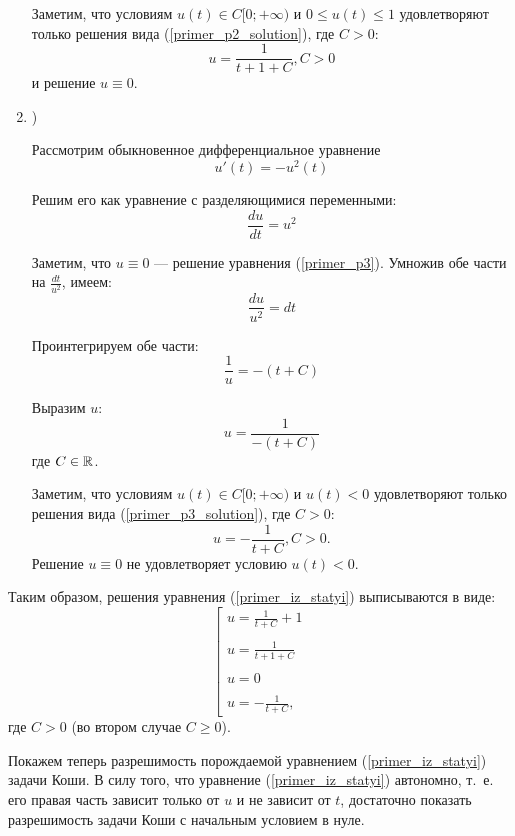 \begin{enumerate}
Заметим, что условиям $u(t) \in C[0; +\infty)$ и $0 \leq u(t) \leq 1$ удовлетворяют только решения вида (\ref{primer_p2_solution}), где $C>0$:
\begin{equation}
	u=\frac{1}{t+1+C}, C>0
\end{equation}
и решение $u \equiv 0$.




\item)

Рассмотрим обыкновенное дифференциальное уравнение
\begin{equation}\label{primer_p3}
	u'(t)=-u^2(t)
\end{equation}

Решим его как уравнение с разделяющимися переменными:
$$
	\frac{du}{dt}=u^2
$$

Заметим, что $u\equiv 0$ --- решение уравнения (\ref{primer_p3}).
Умножив обе части на $\frac{dt}{u^2}$, имеем:
$$
	\frac{du}{u^2}=dt
$$

Проинтегрируем обе части:
$$
	\frac{1}{u}=-(t+C)
$$

Выразим $u$:
\begin{equation}\label{primer_p3_solution}
	u=\frac{1}{-(t+C)}
\end{equation}
где $C\in\mathbb{R}$.

Заметим, что условиям $u(t) \in C[0; +\infty)$ и $u(t) < 0$ удовлетворяют только решения вида (\ref{primer_p3_solution}), где $C>0$:
\begin{equation}
	u=-\frac{1}{t+C}, C>0.
\end{equation}
Решение $u \equiv 0$ не удовлетворяет условию $u(t)<0$.

\end{enumerate}

Таким образом, решения уравнения (\ref{primer_iz_statyi}) выписываются в виде:
\begin{equation}\label{primer_iz_statyi_u_t}
	\left[
		\begin{array}{l}
			u=\frac{1}{t+C}+1
		\\\\
			u=\frac{1}{t+1+C}
		\\\\
			u=0
		\\\\
			u=-\frac{1}{t+C},
		\end{array}
	\right.
\end{equation}
где $C>0$ (во втором случае $C \geq 0$).

Покажем теперь разрешимость порождаемой уравнением (\ref{primer_iz_statyi}) задачи Коши.
В силу того, что уравнение (\ref{primer_iz_statyi}) автономно, т.~е. его правая часть зависит только от $u$ и не зависит от $t$,
достаточно показать разрешимость задачи Коши с начальным условием в нуле.

